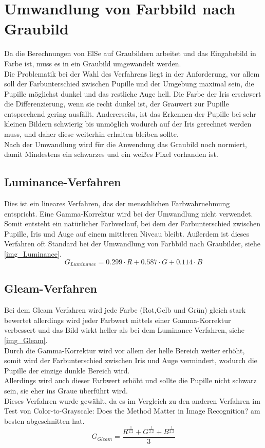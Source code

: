 \section{Umwandlung von Farbbild nach Graubild}
Da die Berechnungen von ElSe auf Graubildern arbeitet und das Eingabebild in Farbe ist, muss es in ein Graubild umgewandelt werden.\\
Die Problematik bei der Wahl des Verfahrens liegt in der Anforderung, vor allem soll der Farbunterschied zwischen Pupille und der Umgebung maximal sein, die Pupille möglichst dunkel und das restliche Auge hell. Die Farbe der Iris erschwert die Differenzierung, wenn sie recht dunkel ist, der Grauwert zur Pupille entsprechend gering ausfällt. Andererseits, ist das Erkennen der Pupille bei sehr kleinen Bildern schwierig bis unmöglich wodurch auf der Iris gerechnet werden muss, und daher diese weiterhin erhalten bleiben sollte.\\
Nach der Umwandlung wird für die Anwendung das Graubild noch normiert, damit Mindestens ein schwarzes und ein weißes Pixel vorhanden ist.
\subsection{Luminance-Verfahren}
\label{gray_Luminance}
Dies ist ein lineares Verfahren, das der menschlichen Farbwahrnehmung entspricht. Eine Gamma-Korrektur wird bei der Umwandlung nicht verwendet.\\
Somit entsteht ein natürlicher Farbverlauf, bei dem der Farbunterschied zwischen Pupille, Iris und Auge auf einem mittleren Niveau bleibt. Außerdem ist dieses Verfahren oft Standard bei der Umwandlung von Farbbild nach Graubilder, siehe \autoref{img_Luminance}.
\[G_{Luminance} = 0.299 \cdot R + 0.587 \cdot G + 0.114 \cdot B\]
\subsection{Gleam-Verfahren}
\label{gray_Gleam}
Bei dem Gleam Verfahren wird jede Farbe (Rot,Gelb und Grün) gleich stark bewertet allerdings wird jeder Farbwert mittels einer Gamma-Korrektur verbessert und das Bild wirkt heller als bei dem Luminance-Verfahren, siehe \autoref{img_Gleam}.\\
Durch die Gamma-Korrektur wird vor allem der helle Bereich weiter erhöht, somit wird der Farbunterschied zwischen Iris und Auge vermindert, wodurch die Pupille der einzige dunkle Bereich wird.\\
Allerdings wird auch dieser Farbwert erhöht und sollte die Pupille nicht schwarz sein, sie eher ins Graue überführt wird.\\
Dieses Verfahren wurde gewählt, da es im Vergleich zu den anderen Verfahren im Test von \glqq Color-to-Grayscale: Does the Method Matter in Image Recognition?\grqq \cite{rgb_to_Gray} am besten abgeschnitten hat.
\[G_{Gleam}=\dfrac{R^{\frac{1}{2.2}} + G^{\frac{1}{2.2}} + B^{\frac{1}{2.2}}}{3}\]

